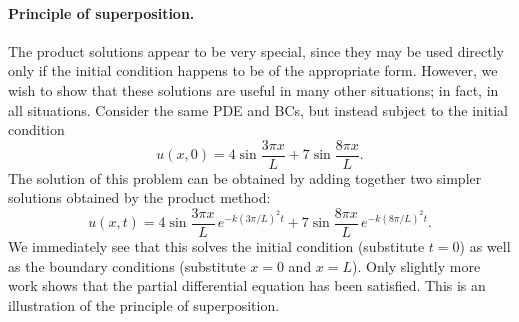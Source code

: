 \paragraph{Principle of superposition.}
The product solutions appear to be very special, since they may be used directly only if the initial condition happens to be of the appropriate form. However, we wish to show that these solutions are useful in many other situations; in fact, in all situations. Consider the same PDE and BCs, but instead subject to the initial condition
\[
u(x,0) = 4\sin\frac{3\pi x}{L} + 7\sin\frac{8\pi x}{L}.
\]
The solution of this problem can be obtained by adding together two simpler solutions obtained by the product method:
\[
u(x,t) = 4\sin\frac{3\pi x}{L}\,e^{-k(3\pi/L)^2 t} + 7\sin\frac{8\pi x}{L}\,e^{-k(8\pi/L)^2 t}.
\]
We immediately see that this solves the initial condition (substitute $t = 0$) as well as the boundary conditions (substitute $x = 0$ and $x = L$). Only slightly more work shows that the partial differential equation has been satisfied. This is an illustration of the principle of superposition.


